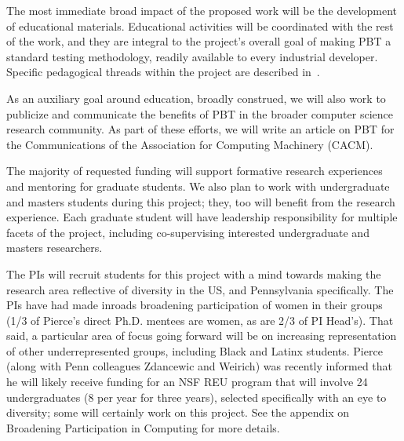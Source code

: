 



  \smallskip

%
The most immediate broad impact of the proposed work will be the
development of educational materials. Educational activities will be
coordinated with the rest of the work, and they are integral to the
project's overall goal of making PBT a standard testing methodology,
readily available to every industrial developer.  Specific pedagogical
threads within the project are described in~.

As an auxiliary goal around education, broadly construed, we will also work to
publicize and communicate the benefits of PBT in the broader computer science
research community. As part of these efforts, we will write an article on PBT
for the Communications of the Association for Computing Machinery
(CACM). \iflater{}\fi

\smallskip
{}
%
The majority of requested funding will support formative research
experiences and mentoring for graduate students. We
also plan to work with undergraduate and masters students during this project;
they, too will benefit from the research experience. Each graduate
student will have leadership responsibility for multiple facets of the
project, including co-supervising interested undergraduate and masters
researchers.

The PIs will recruit students for this project with a mind towards making
the research area reflective of diversity in the US, and Pennsylvania specifically.
The PIs have had made inroads broadening participation of women in their
groups (1/3 of Pierce's direct Ph.D. mentees are women, as are 2/3 of PI
Head's). That said, a particular area of focus going forward will be on increasing representation of
other underrepresented groups, including Black and Latinx students. Pierce (along with Penn colleagues Zdancewic and Weirich)
was recently informed that he will likely receive funding for an
NSF REU program that will involve 24 undergraduates (8 per
year for three years), selected specifically with an eye to diversity;
some will certainly work on this project. See the appendix on Broadening Participation in Computing for more
details.

